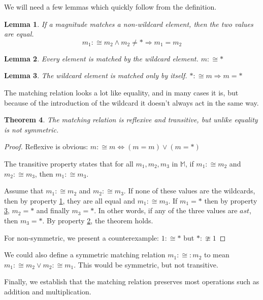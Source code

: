\documentclass[twoside]{article}
\theoremstyle{plain}%
\newtheorem{theorem}{Theorem}[section]
\newtheorem{lemma}[theorem]{Lemma}
\theoremstyle{definition}
\theoremstyle{remark}
\begin{document}
We will need a few lemmas which quickly follow from the definition.

\begin{lemma}
\label{wild_prop_1} If a magnitude matches a non-wildcard element, then the two values are equal. \[m_1 :\cong m_2 \wedge m_2 \neq \ast \Longrightarrow m_1 = m_2\]
\end{lemma}

\begin{lemma}
\label{wild_prop_2}
Every element is matched by the wildcard element. \(m :\cong \ast\)
\end{lemma}

\begin{lemma}
\label{wild_prop_3}
The wildcard element is matched only by itself. \(\ast :\cong m \Longrightarrow m = \ast\)
\end{lemma}

The matching relation looks a lot like equality, and in many cases it is, but because of the introduction of the wildcard it doesn't always act in the same way.

\begin{theorem}
The matching relation is reflexive and transitive, but unlike equality is not symmetric.
\end{theorem}

\begin{proof}
Reflexive is obvious: \(m :\cong m \Longleftrightarrow (m = m) \vee (m = \ast)\)

The transitive property states that for all \(m_1, m_2, m_3\) in \(\mathbb{M}\), if \(m_1 :\cong m_2\) and \(m_2 :\cong m_3\), then \(m_1 :\cong m_3\).

Assume that \(m_1 :\cong m_2\) and \(m_2 :\cong m_3\). If none of these values are the wildcards, then by property \ref{wild_prop_1}, they are all equal and \(m_1 :\cong m_3\). If \(m_1 = \ast\) then by property \ref{wild_prop_3}, \(m_2 = \ast\) and finally \(m_3 = \ast\). In other words, if any of the three values are \(ast\), then \(m_3 = \ast\). By property \ref{wild_prop_2}, the theorem holds.

For non-symmetric, we present a counterexample: \(1 :\cong \ast\) but \(\ast :\ncong 1\)
\end{proof}

We could also define a symmetric matching relation \(m_1 :\cong: m_2\) to mean \(m_1 :\cong m_2 \vee m_2 :\cong m_1\). This would be symmetric, but not transitive.

Finally, we establish that the matching relation preserves most operations such as addition and multiplication.
\end{document}
